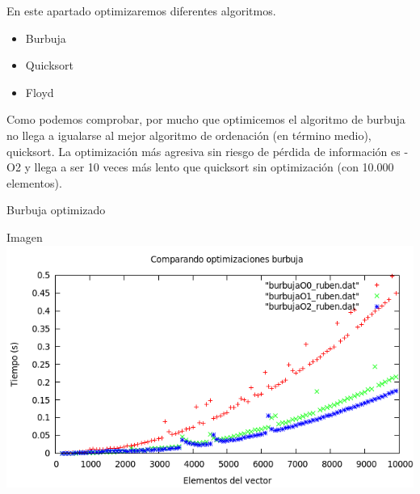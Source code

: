 \documentclass[compress]{beamer}
\begin{document}
\begin{frame}
	\begin{block}
	En este apartado optimizaremos diferentes algoritmos.
	\begin{itemize}
	\item Burbuja
	\item Quicksort
	\item Floyd
	\end{itemize}
	\end{block}
	
	\begin{block}
	Como podemos comprobar, por mucho que optimicemos el algoritmo de burbuja no llega a igualarse al mejor algoritmo de ordenación (en término medio), quicksort. La optimización más agresiva sin riesgo de pérdida de información es -O2 y llega a ser 10 veces más lento que quicksort sin optimización (con 10.000 elementos).
	\end{block}
\end{frame}




\begin{frame}{Burbuja optimizado}
	\begin{alertblock}{Imagen}
	\includegraphics[scale=0.55]{../Graficas/Burbuja/burbuja_optimizacion.png}
	\end{alertblock}
\end{frame}
\end{document}
